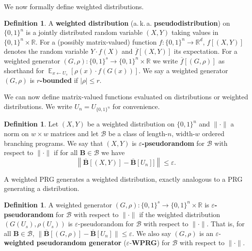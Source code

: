 \documentclass[11pt]{article}
\numberwithin{equation}{section}
\theoremstyle{definition}
\newtheorem{definition}[theorem]{Definition}
\theoremstyle{plain}
\newcommand{\R}{\mathbb R}
\newcommand{\eps}{\varepsilon}
\newcommand{\zo}{\{0,1\}}
\newcommand{\la}{\leftarrow}
\newcommand{\ra}{\rightarrow}
\DeclareMathOperator*{\E}{\mathbb{E}}
\newcommand{\bp}{{\mathbf{B}}}
\newcommand{\bbp}{\overline{\mathbf{B}}}
\begin{document}
We now formally %
define  %
weighted distributions.
\begin{definition}
A \textbf{weighted distribution} %
(a.\,k.\,a.  %
\textbf{pseudodistribution}) on $\zo^n$ is a jointly distributed random variable $(X,Y)$ taking values in $\zo^n\times \R$. For a (possibly %
matrix-valued) %
function $f:\zo^n\ra\R^d$, $f[(X,Y)]$ denotes the random variable $Y\cdot f(X)$ and $\overline{f}[(X,Y)]$ its expectation. For a weighted generator $(G,\rho):\zo^s\ra \zo^n\times \R$ we write $\overline{f}[(G,\rho)]$ as shorthand for $\E_{x\la U_s}[\rho(x)\cdot f(G(x))]$. We say a weighted generator $(G,\rho)$ is \textbf{$r$-bounded} if $|\rho|\leq r$.
\end{definition}
We can now define %
matrix-valued %
functions evaluated on distributions or weighted distributions. We write $U_n=U_{\zo^n}$ for convenience.
\begin{definition}
    Let $(X,Y)$ be a weighted distribution on $\zo^n$ and $\|\cdot\|$ a norm on $w\times w$ matrices and let $\mathcal{B}$ be a class of %
    length-$n$, width-$w$ %
    ordered branching programs. We say that $(X,Y)$ is \textbf{$\eps$-pseudorandom} for $\mathcal{B}$  with respect to $\|\cdot\|$  if for all $\bp \in \mathcal{B}$ we have
    $$\left\| \bbp[(X,Y)] - \bbp[U_n]]\right\|\leq \eps.$$
\end{definition}
A weighted PRG generates a weighted distribution, exactly analogous to a PRG generating a distribution.
\begin{definition}
A weighted generator $(G,\rho):\zo^s\ra\zo^n\times\R$ is \textbf{$\eps$-pseudorandom} for $\mathcal{B}$ with respect to $\|\cdot\|$ if the weighted distribution $(G(U_s),\rho(U_s))$ is $\eps$-pseudorandom for $\mathcal{B}$ with respect to $\|\cdot\|$. That is, for all $\bp\in \mathcal{B}$, $\|\bbp[(G,\rho)]-\bbp[U_n]\|\leq \eps$. We also say $(G,\rho)$ is an $\eps$-\textbf{weighted pseudorandom generator} ($\eps$-\textbf{WPRG}) for $\mathcal{B}$ with respect to $\|\cdot\|$.
\end{definition}
\end{document}
